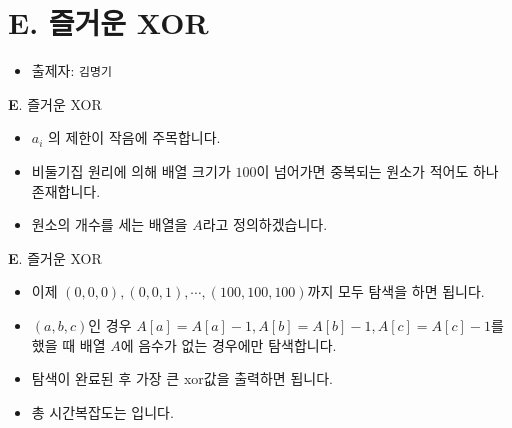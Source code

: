 \section{E. 즐거운 XOR}

\begin{frame} %
    \begin{itemize}
        \item 출제자: \texttt{김명기}
    \end{itemize}
\end{frame}

\begin{frame}{\textbf{E}. 즐거운 XOR}
    \begin{itemize}
		\item $a_i$ 의 제한이 작음에 주목합니다.
		\item 비둘기집 원리에 의해 배열 크기가 $100$이 넘어가면 중복되는 원소가 적어도 하나 존재합니다.
		\item 원소의 개수를 세는 배열을 $A$라고 정의하겠습니다.
	\end{itemize}
\end{frame}

\begin{frame}{\textbf{E}. 즐거운 XOR}
	\begin{itemize}
		\item 이제 $(0,0,0), (0,0,1), \cdots , (100,100,100)$까지 모두 탐색을 하면 됩니다.
		\item $(a, b, c)$인 경우 $A[a]=A[a]-1, A[b]=A[b]-1, A[c]=A[c]-1$를 했을 때 배열 $A$에 음수가 없는 경우에만 탐색합니다.
		\item 탐색이 완료된 후 가장 큰 xor값을 출력하면 됩니다.
		\item 총 시간복잡도는 입니다.
	\end{itemize}
\end{frame}